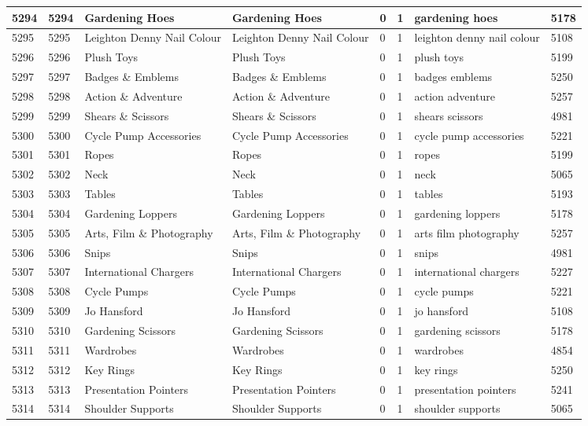 \begin{longtable}{|l|l|l|l|l|l|l|l|}
5294 & 5294 & Gardening Hoes & Gardening Hoes & 0 & 1 & gardening hoes & 5178 \\ \hline 
5295 & 5295 & Leighton Denny Nail Colour & Leighton Denny Nail Colour & 0 & 1 & leighton denny nail colour & 5108 \\ \hline 
5296 & 5296 & Plush Toys & Plush Toys & 0 & 1 & plush toys & 5199 \\ \hline 
5297 & 5297 & Badges \& Emblems & Badges \& Emblems & 0 & 1 & badges emblems & 5250 \\ \hline 
5298 & 5298 & Action \& Adventure & Action \& Adventure & 0 & 1 & action adventure & 5257 \\ \hline 
5299 & 5299 & Shears \& Scissors & Shears \& Scissors & 0 & 1 & shears scissors & 4981 \\ \hline 
5300 & 5300 & Cycle Pump Accessories & Cycle Pump Accessories & 0 & 1 & cycle pump accessories & 5221 \\ \hline 
5301 & 5301 & Ropes & Ropes & 0 & 1 & ropes & 5199 \\ \hline 
5302 & 5302 & Neck & Neck & 0 & 1 & neck & 5065 \\ \hline 
5303 & 5303 & Tables & Tables & 0 & 1 & tables & 5193 \\ \hline 
5304 & 5304 & Gardening Loppers & Gardening Loppers & 0 & 1 & gardening loppers & 5178 \\ \hline 
5305 & 5305 & Arts, Film \& Photography & Arts, Film \& Photography & 0 & 1 & arts film photography & 5257 \\ \hline 
5306 & 5306 & Snips & Snips & 0 & 1 & snips & 4981 \\ \hline 
5307 & 5307 & International Chargers & International Chargers & 0 & 1 & international chargers & 5227 \\ \hline 
5308 & 5308 & Cycle Pumps & Cycle Pumps & 0 & 1 & cycle pumps & 5221 \\ \hline 
5309 & 5309 & Jo Hansford & Jo Hansford & 0 & 1 & jo hansford & 5108 \\ \hline 
5310 & 5310 & Gardening Scissors & Gardening Scissors & 0 & 1 & gardening scissors & 5178 \\ \hline 
5311 & 5311 & Wardrobes & Wardrobes & 0 & 1 & wardrobes & 4854 \\ \hline 
5312 & 5312 & Key Rings & Key Rings & 0 & 1 & key rings & 5250 \\ \hline 
5313 & 5313 & Presentation Pointers & Presentation Pointers & 0 & 1 & presentation pointers & 5241 \\ \hline 
5314 & 5314 & Shoulder Supports & Shoulder Supports & 0 & 1 & shoulder supports & 5065 \\ \hline 

\end{longtable}
